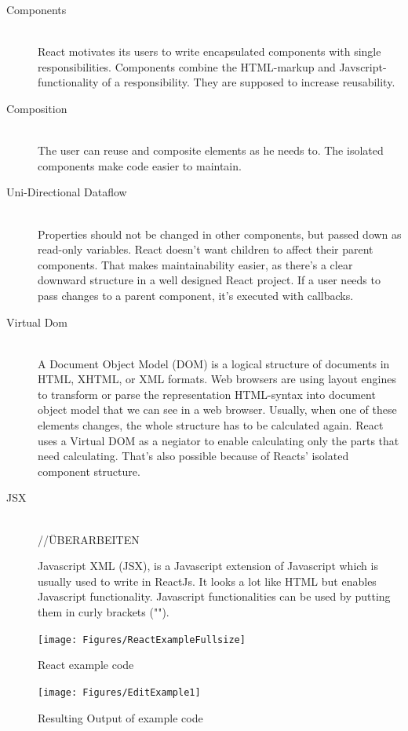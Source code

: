 \begin{description}
    \item[Components] \hfill \\
    React motivates its users to write encapsulated components with single responsibilities. Components combine the HTML-markup and Javscript-functionality of a responsibility. 
    They are supposed to increase reusability. %
    \item[Composition] \hfill \\
    The user can reuse and composite elements as he needs to. 
    The isolated components make code easier to maintain. 
    \item[Uni-Directional Dataflow] \hfill \\
            Properties should not be changed in other components, but passed down as read-only variables. 
            React doesn't want children to affect their parent components. That makes maintainability easier, as there's a clear downward structure in a well designed React project.
            If a user needs to pass changes to a parent component, it's executed with callbacks.
    \item[Virtual Dom]\hfill \\
    A Document Object Model (DOM) is a logical structure of documents in HTML, XHTML, or XML formats. 
    Web browsers are using layout engines to transform or parse the representation HTML-syntax into document object model that we can see in a web browser.
    Usually, when one of these elements changes, the whole structure has to be calculated again. 
    React uses a Virtual DOM as a negiator to enable calculating only the parts that need calculating. That's also possible because of Reacts' isolated component structure.
    \item[JSX] \hfill \\
    //ÜBERARBEITEN 

    Javascript XML (JSX), is a Javascript extension of Javascript which is usually used to write in ReactJs. 
    It looks a lot like HTML but enables Javascript functionality. 
    Javascript functionalities can be used by putting them in curly brackets ("{}").
\end{description}
\begin{figure}[b]
	\centering
    \texttt{[image: Figures/ReactExampleFullsize]}
	\decoRule
	\caption[React1]{React example code}
	\label{fig:reactEx}
\end{figure}

\begin{figure}[t]
    \centering
	\texttt{[image: Figures/EditExample1]}
	\decoRule
	\caption[ReactEx]{Resulting Output of example code}
	\label{fig:resultReact}
\end{figure}


